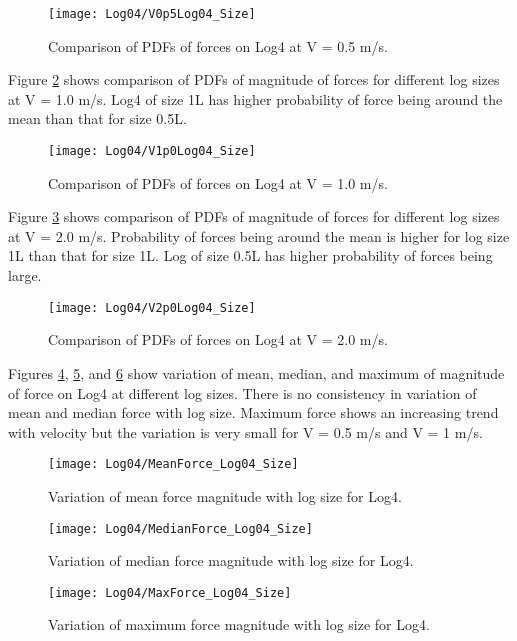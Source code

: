\begin{figure}
\centering
\texttt{[image: Log04/V0p5Log04\_Size]}
\caption{\label{fig:V0p5Log04_Size}Comparison of PDFs of forces on Log4 at V = 0.5 m/s.}
\end{figure}

\noindent Figure \ref{fig:V1p0Log04_Size} shows comparison of PDFs of magnitude of forces for different log sizes at V = 1.0 m/s. Log4 of size 1L has higher probability of force being around the mean than that for size 0.5L. 

\begin{figure}
\centering
\texttt{[image: Log04/V1p0Log04\_Size]}
\caption{\label{fig:V1p0Log04_Size}Comparison of PDFs of forces on Log4 at V = 1.0 m/s.}
\end{figure}

\noindent Figure \ref{fig:V2p0Log04_Size} shows comparison of PDFs of magnitude of forces for different log sizes at V = 2.0 m/s. Probability of forces being around the mean is higher for log size 1L than that for size 1L. Log of size 0.5L has higher probability of forces being large.

\begin{figure}
\centering
\texttt{[image: Log04/V2p0Log04\_Size]}
\caption{\label{fig:V2p0Log04_Size}Comparison of PDFs of forces on Log4 at V = 2.0 m/s.}
\end{figure}

\noindent Figures \ref{fig:MeanForce_Log04_Size}, \ref{fig:MedianForce_Log04_Size}, and \ref{fig:MaxForce_Log04_Size} show variation of mean, median, and maximum of magnitude of force on Log4 at different log sizes. There is no consistency in variation of mean and median force with log size. Maximum force shows an increasing trend with velocity but the variation is very small for V = 0.5 m/s and V = 1 m/s. 

\begin{figure}
\centering
\texttt{[image: Log04/MeanForce\_Log04\_Size]}
\caption{\label{fig:MeanForce_Log04_Size}Variation of mean force magnitude with log size for Log4.}
\end{figure}
\begin{figure}
\centering
\texttt{[image: Log04/MedianForce\_Log04\_Size]}
\caption{\label{fig:MedianForce_Log04_Size}Variation of median force magnitude with log size for Log4.}
\end{figure}
\begin{figure}
\centering
\texttt{[image: Log04/MaxForce\_Log04\_Size]}
\caption{\label{fig:MaxForce_Log04_Size}Variation of maximum force magnitude with log size for Log4.}
\end{figure}

